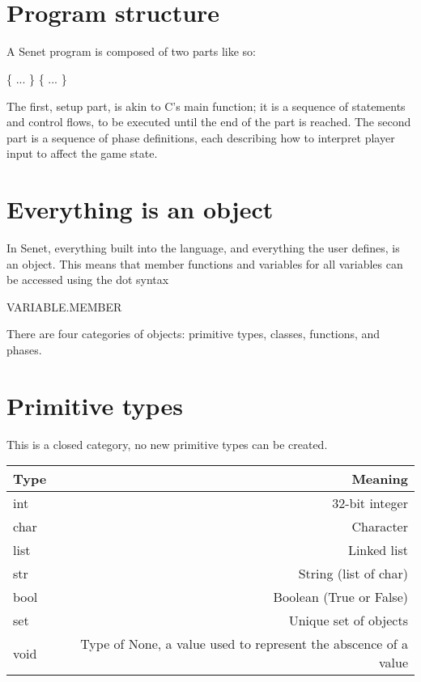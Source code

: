 \documentclass{article}
\title{
    \vspace{2in}
    \textmd{\textbf{\hmwkTitle}}\\
    \vspace{3in}
}
\date{}
\begin{document}
\maketitle

\pagebreak
\section{Program structure}
A Senet program is composed of two parts like so:

\begin{algorithmic}
\State \@setup\{
\State ...
\State \}
\State \@turn\{
\State ...
\State \}
\end{algorithmic}

The first, setup part, is akin to C's main function; it is a sequence of
statements and control flows, to be executed until the end of the part is
reached. The second part is a sequence of phase definitions, each describing
how to interpret player input to affect the game state.

\section{Everything is an object}
In Senet, everything built into the language, and everything the user defines,
is an object. This means that member functions and variables for all variables
can be accessed using the dot syntax
\begin{algorithmic}
\State VARIABLE.MEMBER
\end{algorithmic}
There are four categories of objects: primitive types, classes,
functions, and phases.

\section{Primitive types}
This is a closed category, no new primitive types can be created.

\begin{tabular} {l | r}
\textbf{Type} & \textbf{Meaning}\\ \toprule
int & $32$-bit integer \\ \toprule
char & Character \\ \toprule
list & Linked list \\ \toprule %
str & String (list of char) \\ \toprule
bool & Boolean (True or False) \\ \toprule
set & Unique set of objects \\ \toprule
void & Type of None, a value used to represent the abscence of a value \\ \toprule

\end{tabular}
\end{document}
